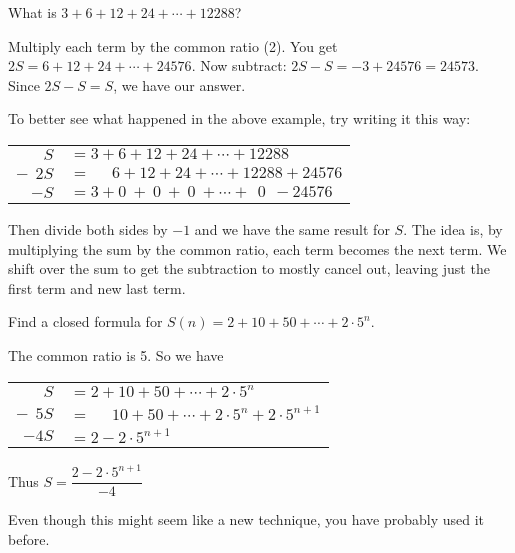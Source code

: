 \documentclass[12pt]{article}
\begin{document}
\begin{example} What is $3 + 6 + 12 + 24 + \cdots + 12288$?
\begin{solution}
  Multiply each term by the common ratio (2).  You get $2S = 6 + 12 + 24 + \cdots + 24576$.   Now subtract: $2S - S = -3 + 24576 = 24573$.  Since $2S - S = S$, we have our answer.
  \end{solution}
\end{example}

To better see what happened in the above example, try writing it this way:

\begin{center}
\begin{tabular}{rl}
  $S $& $= 3 + 6 + 12 + 24 + \cdots + 12288$ \\
 $-~~2S$ & $= ~~~~~~6 + 12 + 24 + \cdots + 12288 + 24576 $\\ \hline
 $-S$ &$ = 3 + 0 ~+~ 0 ~+~ 0 ~ +  \cdots + ~~0 ~~ - 24576$
\end{tabular}
\end{center}

Then divide both sides by $-1$ and we have the same result for $S$.  The idea is, by multiplying the sum by the common ratio, each term becomes the next term.  We shift over the sum to get the subtraction to mostly cancel out, leaving just the first term and new last term.

\begin{example}
  Find a closed formula for $S(n) = 2 + 10 + 50 + \cdots + 2\cdot 5^n$.
  \begin{solution}
    The common ratio is 5.  So we have

    \begin{center}
\begin{tabular}{rl}
  $S $& $= 2 + 10 + 50 + \cdots + 2\cdot 5^n$ \\
 $-~~5S$ & $= ~~~~~~10 + 50 + \cdots + 2\cdot 5^n + 2\cdot5^{n+1} $\\ \hline
 $-4S$ &$ = 2  - 2\cdot5^{n+1}$
\end{tabular}
\end{center}

Thus $S = \dfrac{2-2\cdot 5^{n+1}}{-4}$
  \end{solution}
\end{example}

Even though this might seem like a new technique, you have probably used it before.
\end{document}
